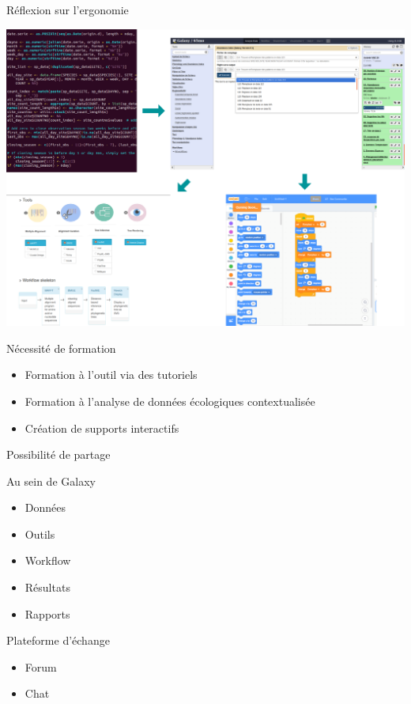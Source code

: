 \documentclass[ignorenonframetext,aspectratio=129]{beamer}
\providecommand{\tightlist}{%
  \setlength{\itemsep}{0pt}\setlength{\parskip}{0pt}}
\begin{document}
\begin{frame}{Réflexion sur l'ergonomie}

\includegraphics{figures/codeToTool.png}

\end{frame}

\begin{frame}{Nécessité de formation}

\begin{itemize}
\tightlist
\item
  Formation à l'outil via des tutoriels
\item
  Formation à l'analyse de données écologiques contextualisée
\item
  Création de supports interactifs
\end{itemize}

\end{frame}

\begin{frame}{Possibilité de partage}

\begin{block}{Au sein de Galaxy}

\begin{itemize}
\tightlist
\item
  Données
\item
  Outils
\item
  Workflow
\item
  Résultats
\item
  Rapports
\end{itemize}

\end{block}

\begin{block}{Plateforme d'échange}

\begin{itemize}
\tightlist
\item
  Forum
\item
  Chat
\end{itemize}

\end{block}

\end{frame}
\end{document}
